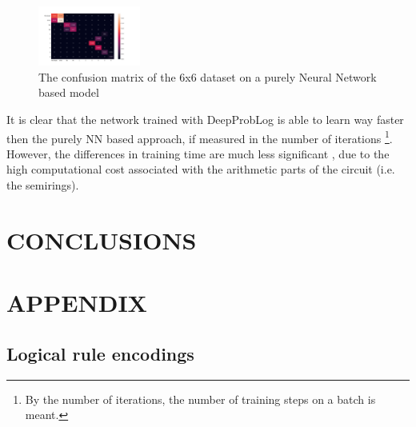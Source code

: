 \documentclass[english]{sobraep}
\begin{document}
\begin{figure}[H]
    \begin{center}
    \includegraphics[width=0.3\textwidth]{confusion_matrix_pure_NN_6x6_clear_mistakes.png} 
    \captionsetup{justification=centering}
    \caption{The confusion matrix of the 6x6 dataset on a purely Neural Network based model}
    \label{fig:confusion_matrix_6x6_pure_NN}
    \end{center}
\end{figure}


It is clear that the network trained with DeepProbLog is able to learn way faster then the purely NN based approach, if measured in the number of iterations \footnote{By the number of iterations, the number of training steps on a batch is meant.}. However, the differences in training time are much less significant%
, due to the high computational cost associated with the arithmetic parts of the circuit (i.e. the semirings).

\section{CONCLUSIONS}
\label{sec:conclusions}

\section{APPENDIX}
\subsection{Logical rule encodings}
\label{appendix:logical_rule_encodings}


 

\end{document}

